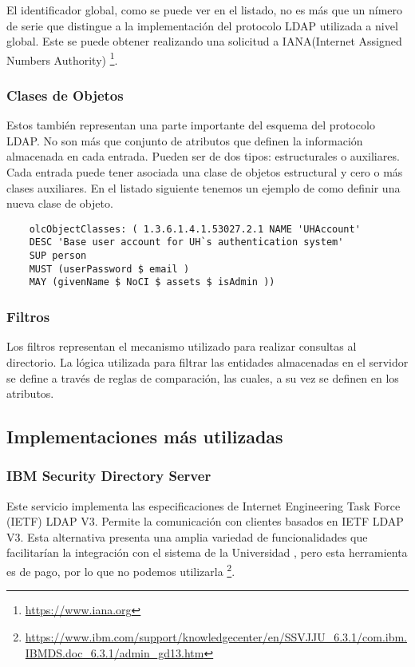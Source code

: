 El identificador global, como se puede ver en el listado, no es más que un nímero de serie 
que distingue a la implementación del protocolo LDAP utilizada a nivel global. Este se puede 
obtener realizando una solicitud a IANA(Internet Assigned Numbers Authority)
\footnote{ \url{https://www.iana.org}}.

\subsubsection{Clases de Objetos}
Estos también representan una parte importante del esquema del protocolo LDAP. No son más que 
conjunto de atributos que definen la información almacenada en cada entrada. Pueden ser de 
dos tipos: estructurales o auxiliares. Cada entrada puede tener asociada una clase de 
objetos estructural y cero o más clases auxiliares. En el listado siguiente tenemos un ejemplo
de como definir una nueva clase de objeto.

\begin{lstlisting}
	olcObjectClasses: ( 1.3.6.1.4.1.53027.2.1 NAME 'UHAccount'
	DESC 'Base user account for UH`s authentication system'
	SUP person
	MUST (userPassword $ email )
	MAY (givenName $ NoCI $ assets $ isAdmin ))
\end{lstlisting}

\subsubsection{Filtros}
Los filtros representan el mecanismo utilizado para realizar consultas al directorio. 
La lógica utilizada para filtrar las entidades almacenadas en el servidor se define a través 
de reglas de comparación, las cuales, a su vez se definen en los atributos.

\subsection{Implementaciones más utilizadas}
\subsubsection{IBM Security Directory Server}
Este servicio implementa las especificaciones de Internet Engineering Task Force (IETF) LDAP 
V3. Permite la comunicación con clientes basados en IETF LDAP V3. Esta alternativa presenta 
una amplia variedad de funcionalidades que facilitarían la integración con el sistema de la 
Universidad , pero esta herramienta es de pago, por lo que no podemos utilizarla
\footnote{ \url{https://www.ibm.com/support/knowledgecenter/en/SSVJJU_6.3.1/com.ibm.IBMDS.doc_6.3.1/admin_gd13.htm}}.

